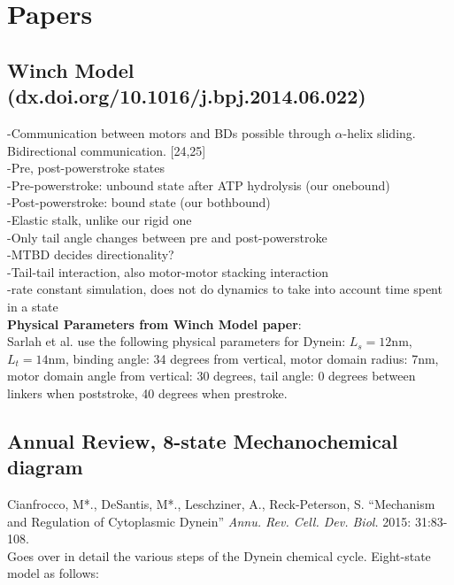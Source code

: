 \documentclass[10pt]{article} %
\begin{document}
\section{Papers}
\subsection{Winch Model (dx.doi.org/10.1016/j.bpj.2014.06.022)}
-Communication between motors and BDs possible through $\alpha$-helix sliding. Bidirectional communication. [24,25]\\
-Pre, post-powerstroke states\\
-Pre-powerstroke: unbound state after ATP hydrolysis (our onebound)\\
-Post-powerstroke: bound state (our bothbound)\\
-Elastic stalk, unlike our rigid one\\
-Only tail angle changes between pre and post-powerstroke\\
-MTBD decides directionality?\\
-Tail-tail interaction, also motor-motor stacking interaction\\
-rate constant simulation, does not do dynamics to take into account time spent in a state\\

\textbf{Physical Parameters from Winch Model paper}:\\
Sarlah et al. use the following physical parameters for Dynein: $L_s = 12$nm, $L_t = 14$nm, binding angle: 34 degrees from vertical, motor
domain radius: 7nm, motor domain angle from vertical: 30 degrees, tail angle: 0 degrees between linkers when poststroke, 40 degrees when prestroke.

\subsection{Annual Review, 8-state Mechanochemical diagram}
Cianfrocco, M*., DeSantis, M*., Leschziner, A., Reck-Peterson, S. ``Mechanism and Regulation of Cytoplasmic Dynein'' \textit{Annu. Rev. Cell. Dev. Biol.} 2015: 31:83-108.\\

Goes over in detail the various steps of the Dynein chemical cycle. Eight-state model as follows:\\
\end{document}
